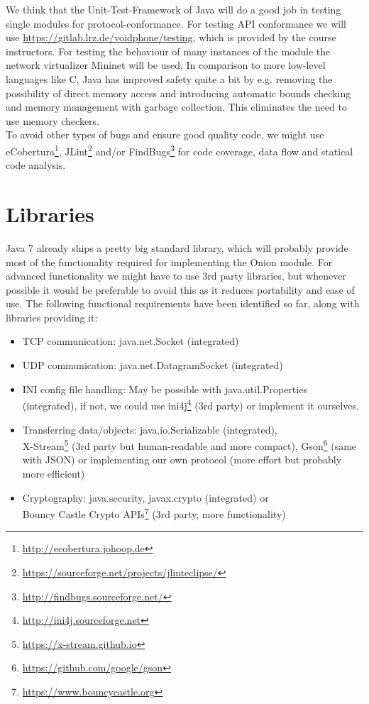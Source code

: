 \documentclass{article}
\begin{document}
We think that the Unit-Test-Framework of Java will do a good job in testing
single modules for protocol-conformance. For testing API
conformance we will use \url{https://gitlab.lrz.de/voidphone/testing}, which is
provided by the course instructors. For testing the behaviour of many instances
of the module the network virtualizer Mininet will be used.
In comparison to more low-level languages like C, Java has improved safety quite a bit by e.g. removing the possibility of direct memory access and introducing automatic bounds checking and memory management with garbage collection. This eliminates the need to use memory checkers. \\
To avoid other types of bugs and ensure good quality code, we might use eCobertura\footnote{\url{http://ecobertura.johoop.de}}, JLint\footnote{\url{https://sourceforge.net/projects/jlinteclipse/}} and/or FindBugs\footnote{\url{http://findbugs.sourceforge.net/}} for code coverage, data flow and statical code analysis.

\section{Libraries}
Java 7 already ships a pretty big standard library, which will probably provide most of the functionality required for implementing the Onion module. For advanced functionality we might have to use 3rd party libraries, but whenever possible it would be preferable to avoid this as it reduces portability and ease of use. 
The following functional requirements have been identified so far, along with libraries providing it:
\begin{itemize}
\item TCP communication: java.net.Socket (integrated)
\item UDP communication: java.net.DatagramSocket (integrated)
\item INI config file handling: May be possible with java.util.Properties (integrated), if not, we could use ini4j\footnote{\url{http://ini4j.sourceforge.net}} (3rd party) or implement it ourselves.
\item Transferring data/objects: java.io.Serializable (integrated), \\ X-Stream\footnote{\url{https://x-stream.github.io}} (3rd party but human-readable and more compact), Gson\footnote{\url{https://github.com/google/gson}} (same with JSON) or implementing our own protocol (more effort but probably more efficient)
\item Cryptography: java.security, javax.crypto (integrated) or \\ Bouncy Castle Crypto APIs\footnote{\url{https://www.bouncycastle.org}} (3rd party, more functionality)
\end{itemize}
\end{document}
